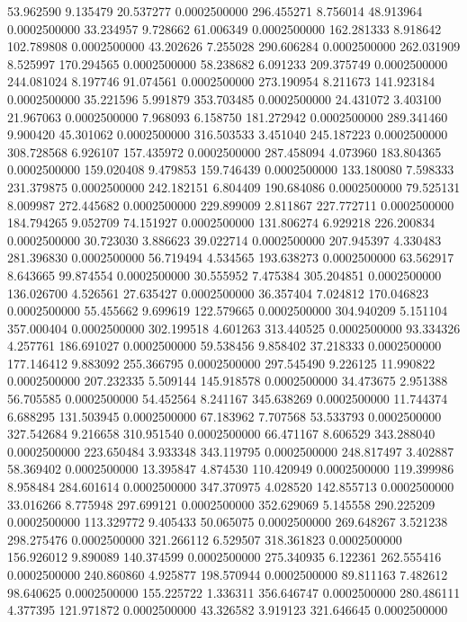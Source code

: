 53.962590 9.135479 20.537277 0.0002500000
296.455271 8.756014 48.913964 0.0002500000
33.234957 9.728662 61.006349 0.0002500000
162.281333 8.918642 102.789808 0.0002500000
43.202626 7.255028 290.606284 0.0002500000
262.031909 8.525997 170.294565 0.0002500000
58.238682 6.091233 209.375749 0.0002500000
244.081024 8.197746 91.074561 0.0002500000
273.190954 8.211673 141.923184 0.0002500000
35.221596 5.991879 353.703485 0.0002500000
24.431072 3.403100 21.967063 0.0002500000
7.968093 6.158750 181.272942 0.0002500000
289.341460 9.900420 45.301062 0.0002500000
316.503533 3.451040 245.187223 0.0002500000
308.728568 6.926107 157.435972 0.0002500000
287.458094 4.073960 183.804365 0.0002500000
159.020408 9.479853 159.746439 0.0002500000
133.180080 7.598333 231.379875 0.0002500000
242.182151 6.804409 190.684086 0.0002500000
79.525131 8.009987 272.445682 0.0002500000
229.899009 2.811867 227.772711 0.0002500000
184.794265 9.052709 74.151927 0.0002500000
131.806274 6.929218 226.200834 0.0002500000
30.723030 3.886623 39.022714 0.0002500000
207.945397 4.330483 281.396830 0.0002500000
56.719494 4.534565 193.638273 0.0002500000
63.562917 8.643665 99.874554 0.0002500000
30.555952 7.475384 305.204851 0.0002500000
136.026700 4.526561 27.635427 0.0002500000
36.357404 7.024812 170.046823 0.0002500000
55.455662 9.699619 122.579665 0.0002500000
304.940209 5.151104 357.000404 0.0002500000
302.199518 4.601263 313.440525 0.0002500000
93.334326 4.257761 186.691027 0.0002500000
59.538456 9.858402 37.218333 0.0002500000
177.146412 9.883092 255.366795 0.0002500000
297.545490 9.226125 11.990822 0.0002500000
207.232335 5.509144 145.918578 0.0002500000
34.473675 2.951388 56.705585 0.0002500000
54.452564 8.241167 345.638269 0.0002500000
11.744374 6.688295 131.503945 0.0002500000
67.183962 7.707568 53.533793 0.0002500000
327.542684 9.216658 310.951540 0.0002500000
66.471167 8.606529 343.288040 0.0002500000
223.650484 3.933348 343.119795 0.0002500000
248.817497 3.402887 58.369402 0.0002500000
13.395847 4.874530 110.420949 0.0002500000
119.399986 8.958484 284.601614 0.0002500000
347.370975 4.028520 142.855713 0.0002500000
33.016266 8.775948 297.699121 0.0002500000
352.629069 5.145558 290.225209 0.0002500000
113.329772 9.405433 50.065075 0.0002500000
269.648267 3.521238 298.275476 0.0002500000
321.266112 6.529507 318.361823 0.0002500000
156.926012 9.890089 140.374599 0.0002500000
275.340935 6.122361 262.555416 0.0002500000
240.860860 4.925877 198.570944 0.0002500000
89.811163 7.482612 98.640625 0.0002500000
155.225722 1.336311 356.646747 0.0002500000
280.486111 4.377395 121.971872 0.0002500000
43.326582 3.919123 321.646645 0.0002500000
